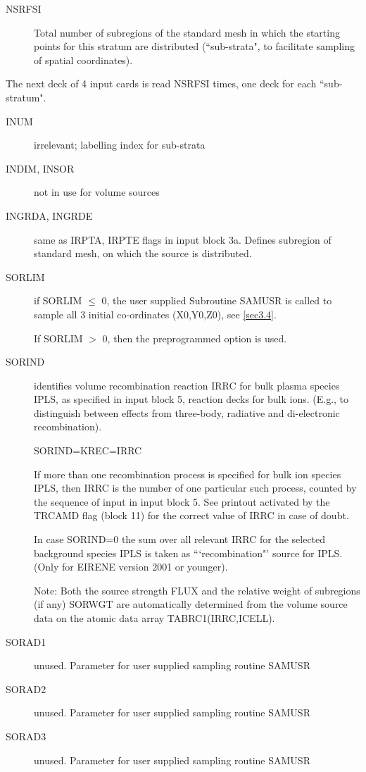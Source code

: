 \begin{description}
  \item[NSRFSI] Total number of subregions of the standard mesh in which the
        starting points for this stratum are distributed (``sub-strata", to facilitate
        sampling of spatial coordinates).
\end{description}
The next deck of 4 input cards is read NSRFSI times, one deck for each
``sub-stratum".
\begin{description}
  \item[INUM] irrelevant; labelling index for sub-strata
  \item[INDIM, INSOR] not
        in use for volume sources
  \item[INGRDA, INGRDE] same as IRPTA, IRPTE flags in
        input block 3a.
        Defines subregion of standard mesh, on which the source is distributed.
  \item[SORLIM] if SORLIM $\le$ 0, the user supplied Subroutine SAMUSR is called
        to sample all 3 initial co-ordinates (X0,Y0,Z0), see \cref{sec3.4}.

        If SORLIM $>$  0, then the preprogrammed option is used.
  \item[SORIND] identifies volume recombination reaction IRRC for bulk plasma
        species IPLS, as specified in input block 5, reaction decks for bulk ions.
        (E.g., to distinguish between effects from three-body, radiative and
        di-electronic recombination).

        SORIND=KREC=IRRC 

        If more than one recombination process is specified for bulk ion species IPLS,
        then IRRC is the number of one particular such process, counted by the sequence
        of input in input block 5.
        See printout activated by the TRCAMD flag (block 11) for the correct value of
        IRRC in case of doubt.

        In case SORIND=0 the sum over all relevant IRRC for the selected background
        species IPLS is taken as ```recombination"' source for IPLS.
        (Only for EIRENE version 2001 or younger).

        Note: Both the source strength FLUX and the relative weight of subregions (if
        any) SORWGT are automatically determined from the volume source data on the
        atomic data array TABRC1(IRRC,ICELL).
  \item[SORAD1] unused.
        Parameter for user supplied sampling routine SAMUSR
  \item[SORAD2] unused.
        Parameter for user supplied sampling routine SAMUSR
  \item[SORAD3] unused.
        Parameter for user supplied sampling routine SAMUSR 


\end{description}
